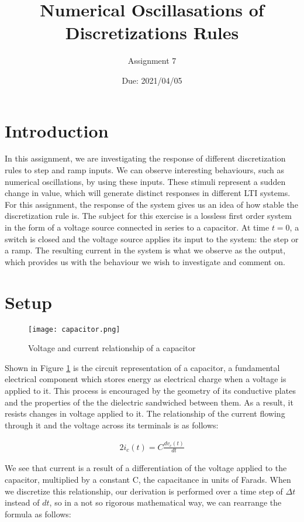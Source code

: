 \documentclass[10pt, oneside, letterpaper]{article}
\title{Numerical Oscillasations of Discretizations Rules}
\author{Assignment 7}
\date{Due: 2021/04/05}
\begin{document}
\maketitle
\thispagestyle{fancy}

\section{Introduction}

In this assignment, we are investigating the response of different discretization rules to step and ramp inputs. We can observe interesting behaviours, such as numerical oscillations, by using these inputs. These stimuli represent a sudden change in value, which will generate distinct responses in different LTI systems. For this assignment, the response of the system gives us an idea of how stable the discretization rule is. The subject for this exercise is a lossless first order system in the form of a voltage source connected in series to a capacitor. At time $t=0$, a switch is closed and the voltage source applies its input to the system: the step or a ramp. The resulting current in the system is what we observe as the output, which provides us with the behaviour we wish to investigate and comment on.

\section{Setup}

\begin{figure}[H]
  \centering
  \texttt{[image: capacitor.png]}
  \caption{Voltage and current relationship of a capacitor}
  \label{capacitor}
\end{figure}

Shown in Figure \ref{capacitor} is the circuit representation of a capacitor, a fundamental electrical component which stores energy as electrical charge when a voltage is applied to it. This process is encouraged by the geometry of its conductive plates and the properties of the the dielectric sandwiched between them. As a result, it resists changes in voltage applied to it. The relationship of the current flowing through it and the voltage across its terminals is as follows:

\begin{alignat}{2}
  i_c(t) = C\frac{dv_c(t)}{dt} 
\end{alignat}

We see that current is a result of a differentiation of the voltage applied to the capacitor, multiplied by a constant C, the capacitance in units of Farads. When we discretize this relationship, our derivation is performed over a time step of $\Delta{}t$ instead of $dt$, so in a not so rigorous mathematical way, we can rearrange the formula as follows:
\end{document}

